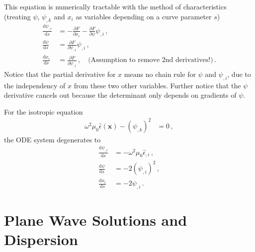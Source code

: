 \documentclass[12pt,a4paper,twoside,openright,BCOR10mm,headsepline,titlepage,abstracton,chapterprefix,final]{scrreprt}
\newcommand\Vector[1]{{\mathbf{#1}}}
\newcommand\Tensor[1]{\hat{#1}}
\newcommand\permittivity{\Tensor{\epsilon}}
\begin{document}
This equation is numerically tractable with the method of characteristics (treating $\psi$, $\psi_{,k}$ and $x_i$ as variables depending on a curve parameter $s$)
\begin{align}
 \frac{\text{d}\psi_{,i}}{\text{d}s} &= -\frac{\partial F}{\partial x_i} - \frac{\partial F}{\partial \psi} \psi_{,i}\,,\\
 \frac{\text{d}\psi}{\text{d}s} &= \frac{\partial F}{\partial \psi_{,i}} \psi_{,i}\,,\\
 \frac{\text{d}x_i}{\text{d}s} &= \frac{\partial F}{\partial \psi_{,i}}\,,\quad \text{(Assumption to remove 2nd derivatives!)}\,. 
\end{align}
Notice that the partial derivative for $x$ means no chain rule for $\psi$ and $\psi_{,i}$, due to the independency of $x$ from these two other variables.
Further notice that the $\psi$ derivative cancels out because the determinant only depends on gradients of $\psi$.

For the isotropic equation
\begin{align}
 \omega^2 \mu_0 \permittivity(\Vector{x}) - (\psi_{,k})^2&= 0\,,
\end{align}
the ODE system degenerates to
\begin{align}
 \frac{\text{d}\psi_{,i}}{\text{d}s} &= -\omega^2 \mu_0 \permittivity_{,i}\,,\\
 \frac{\text{d}\psi}{\text{d}s} &= -2 (\psi_{,i})^2\,,\\
 \frac{\text{d}x_i}{\text{d}s} &= -2 \psi_{,i}\,. 
\end{align}

\section{Plane Wave Solutions and Dispersion}
\end{document}
